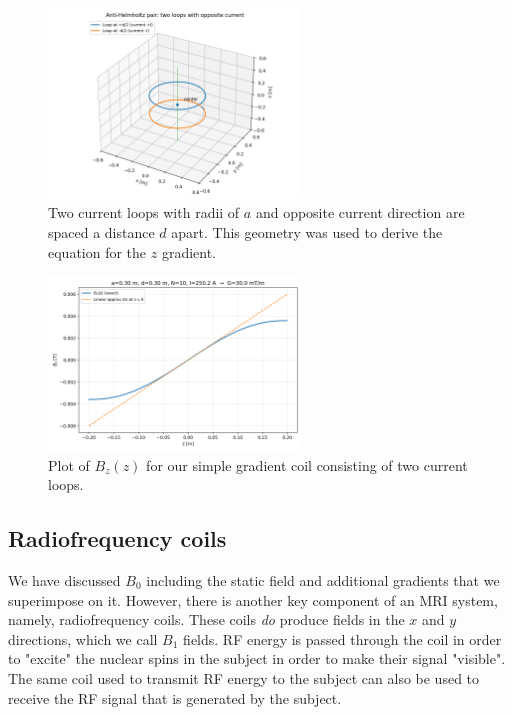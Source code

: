 \documentclass[12pt]{article}
\begin{document}
{\begin{figure}[h]
    \centering
    \includegraphics[width=0.6\textwidth]{antihelmholtz_geometry.png}
    \caption{Two current loops with radii of $a$ and opposite current direction are spaced a distance $d$ apart. This geometry was used to derive the equation for the $z$ gradient.}
    \label{fig:gz_setup}
\end{figure}


\begin{figure}[h]
    \centering
    \includegraphics[width=0.6\textwidth]{antihelmholtz_Bz_vs_z.png}
    \caption{Plot of $B_z(z)$ for our simple gradient coil consisting of two current loops.}
    \label{fig:gz_setup}
\end{figure}

\newpage

\subsection{Radiofrequency coils}

We have discussed $B_0$ including the static field and additional gradients that we superimpose on it. However, there is another key component of an MRI system, namely, radiofrequency coils. These coils \emph{do} produce fields in the $x$ and $y$ directions, which we call $B_1$ fields. RF energy is passed through the coil in order to "excite" the nuclear spins in the subject in order to make their signal "visible". The same coil used to transmit RF energy to the subject can also be used to receive the RF signal that is generated by the subject.  

}
\end{document}
